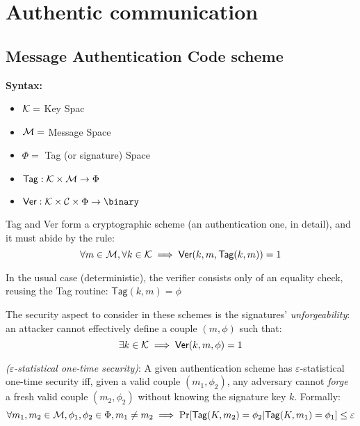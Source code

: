 
\section{Authentic communication}


\subsection{Message Authentication Code scheme}

\textbf{Syntax:}

\begin{itemize}
    \item $\mathcal{K} = $ Key Spac 
    \item $\mathcal{M} = $ Message Space
    \item $\Phi = $ Tag (or signature) Space
    \item $\textsf{Tag}: \mathcal{K} \times \mathcal{M} \to \Phi$
    \item $\textsf{Ver}: \K \times \C \times \Phi \to \binary$
\end{itemize}

\textsf{Tag} and \textsf{Ver} form a cryptographic scheme (an authentication one, in detail), and it must abide by the rule:
\[
    \forall m \in \mathcal{M}, \forall k \in \mathcal{K} \implies \textsf{Ver}(k, m, \textsf{Tag}(k, m)) = 1
\]

In the usual case (deterministic), the verifier consists only of an equality check, reusing the \textsf{Tag} routine: $\textsf{Tag}(k, m) = \phi$

The security aspect to consider in these schemes is the signatures' \emph{unforgeability}: an attacker cannot effectively define a couple $(m, \phi)$ such that:
\[
    \exists k \in \mathcal{K} \implies \textsf{Ver}(k, m, \phi) = 1
\]

\begin{definition} \emph{($\varepsilon$-statistical one-time security)}: A given authentication scheme has $\varepsilon$-statistical one-time security iff, given a valid couple $(m_1, \phi_2)$, any adversary cannot \emph{forge} a fresh valid couple $(m_2, \phi_2)$ without knowing the signature key $k$. Formally:
    \[
        \forall m_1, m_2 \in \mathcal{M}, \phi_1, \phi_2 \in \Phi, m_1 \neq m_2 \implies \Pr[\textsf{Tag}(K, m_2) = \phi_2|\textsf{Tag}(K, m_1) = \phi_1] \leq \varepsilon
    \]
    
\end{definition}

